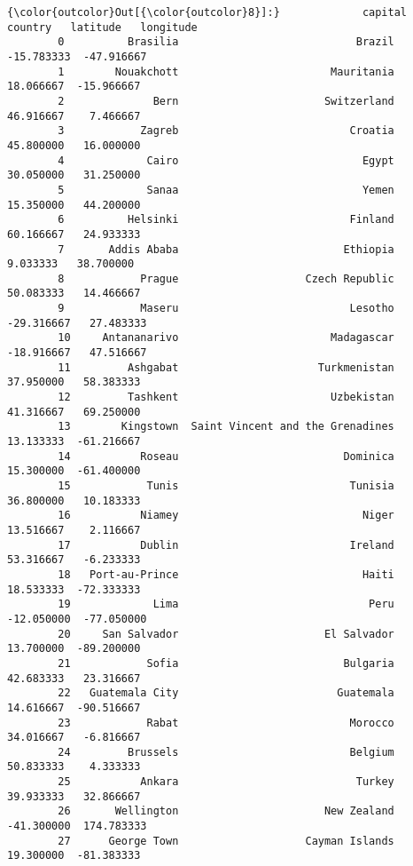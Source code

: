 \documentclass[11pt]{article}
\begin{document}
\begin{Verbatim}[commandchars=\\\{\}]
{\color{outcolor}Out[{\color{outcolor}8}]:}             capital                           country   latitude   longitude
        0          Brasilia                            Brazil -15.783333  -47.916667
        1        Nouakchott                        Mauritania  18.066667  -15.966667
        2              Bern                       Switzerland  46.916667    7.466667
        3            Zagreb                           Croatia  45.800000   16.000000
        4             Cairo                             Egypt  30.050000   31.250000
        5             Sanaa                             Yemen  15.350000   44.200000
        6          Helsinki                           Finland  60.166667   24.933333
        7       Addis Ababa                          Ethiopia   9.033333   38.700000
        8            Prague                    Czech Republic  50.083333   14.466667
        9            Maseru                           Lesotho -29.316667   27.483333
        10     Antananarivo                        Madagascar -18.916667   47.516667
        11         Ashgabat                      Turkmenistan  37.950000   58.383333
        12         Tashkent                        Uzbekistan  41.316667   69.250000
        13        Kingstown  Saint Vincent and the Grenadines  13.133333  -61.216667
        14           Roseau                          Dominica  15.300000  -61.400000
        15            Tunis                           Tunisia  36.800000   10.183333
        16           Niamey                             Niger  13.516667    2.116667
        17           Dublin                           Ireland  53.316667   -6.233333
        18   Port-au-Prince                             Haiti  18.533333  -72.333333
        19             Lima                              Peru -12.050000  -77.050000
        20     San Salvador                       El Salvador  13.700000  -89.200000
        21            Sofia                          Bulgaria  42.683333   23.316667
        22   Guatemala City                         Guatemala  14.616667  -90.516667
        23            Rabat                           Morocco  34.016667   -6.816667
        24         Brussels                           Belgium  50.833333    4.333333
        25           Ankara                            Turkey  39.933333   32.866667
        26       Wellington                       New Zealand -41.300000  174.783333
        27      George Town                    Cayman Islands  19.300000  -81.383333

\end{Verbatim}
\end{document}
